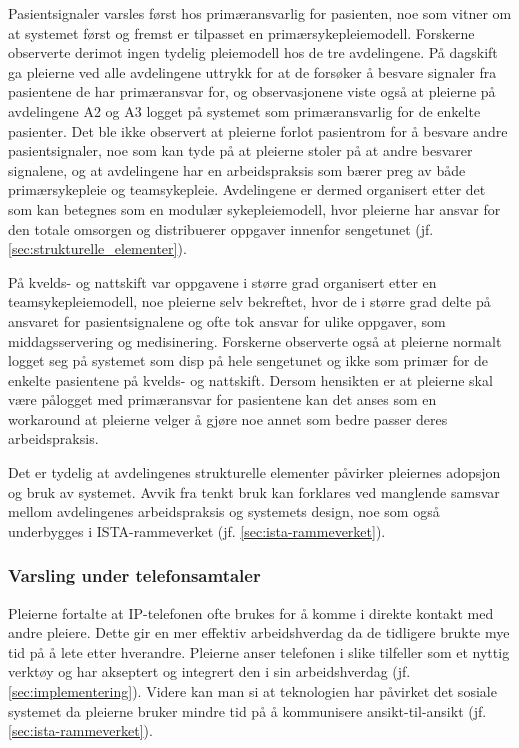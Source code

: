\noindent
Pasientsignaler varsles først hos primæransvarlig for pasienten, noe som vitner om at systemet først og fremst er tilpasset en primærsykepleiemodell. Forskerne observerte derimot ingen tydelig pleiemodell hos de tre avdelingene. På dagskift ga pleierne ved alle avdelingene uttrykk for at de forsøker å besvare signaler fra pasientene de har primæransvar for, og observasjonene viste også at pleierne på avdelingene A2 og A3 logget på systemet som primæransvarlig for de enkelte pasienter. Det ble ikke observert at pleierne forlot pasientrom for å besvare andre pasientsignaler, noe som kan tyde på at pleierne stoler på at andre besvarer signalene, og at avdelingene har en arbeidspraksis som bærer preg av både primærsykepleie og teamsykepleie. Avdelingene er dermed organisert etter det som kan betegnes som en modulær sykepleiemodell, hvor pleierne har ansvar for den totale omsorgen og distribuerer oppgaver innenfor sengetunet (jf. \ref{sec:strukturelle_elementer}).

\noindent
På kvelds- og nattskift var oppgavene i større grad organisert etter en teamsykepleiemodell, noe pleierne selv bekreftet, hvor de i større grad delte på ansvaret for pasientsignalene og ofte tok ansvar for ulike oppgaver, som middagsservering og medisinering. Forskerne observerte også at pleierne normalt logget seg på systemet som disp på hele sengetunet og ikke som primær for de enkelte pasientene på kvelds- og nattskift. Dersom hensikten er at pleierne skal være pålogget med primæransvar for pasientene kan det anses som en workaround at pleierne velger å gjøre noe annet som bedre passer deres arbeidspraksis.

\noindent
Det er tydelig at avdelingenes strukturelle elementer påvirker pleiernes adopsjon og bruk av systemet. Avvik fra tenkt bruk kan forklares ved manglende samsvar mellom avdelingenes arbeidspraksis og systemets design, noe som også underbygges i ISTA-rammeverket (jf. \ref{sec:ista-rammeverket}). 

\subsubsection{Varsling under telefonsamtaler}
Pleierne fortalte at IP-telefonen ofte brukes for å komme i direkte kontakt med andre pleiere. Dette gir en mer effektiv arbeidshverdag da de tidligere brukte mye tid på å lete etter hverandre. Pleierne anser telefonen i slike tilfeller som et nyttig verktøy og har akseptert og integrert den i sin arbeidshverdag (jf. \ref{sec:implementering}). Videre kan man si at teknologien har påvirket det sosiale systemet da pleierne bruker mindre tid på å kommunisere ansikt-til-ansikt (jf. \ref{sec:ista-rammeverket}). 

